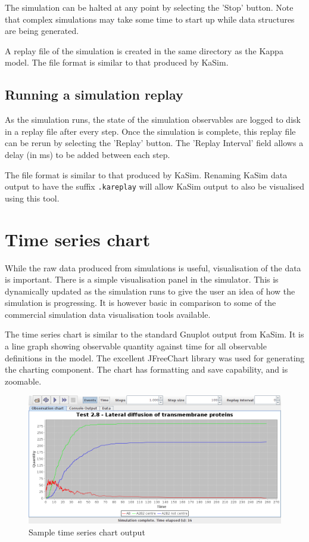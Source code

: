 The simulation can be halted at any point by selecting the 'Stop' button. Note that complex simulations may take some time to start up while data structures are being generated.

A replay file of the simulation is created in the same directory as the Kappa model. The file format is similar to that produced by KaSim.

\subsection{Running a simulation replay}

As the simulation runs, the state of the simulation observables are logged to disk in a replay file after every step. Once the simulation is complete, this replay file can be rerun by selecting the 'Replay' button. The 'Replay Interval' field allows a delay (in ms) to be added between each step.

The file format is similar to that produced by KaSim. Renaming KaSim data output to have the suffix \verb|.kareplay| will allow KaSim output to also be visualised using this tool.

\section{Time series chart}

While the raw data produced from simulations is useful, visualisation of the data is important. There is a simple visualisation panel in the simulator. This is dynamically updated as the simulation runs to give the user an idea of how the simulation is progressing. It is however basic in comparison to some of the commercial simulation data visualisation tools available.

The time series chart is similar to the standard Gnuplot output from KaSim. It is a line graph showing observable quantity against time for all observable definitions in the model. The excellent JFreeChart \citep{JFreeChartwebsite} library was used for generating the charting component. The chart has formatting and save capability, and is zoomable.

\begin{figure}[h!]
 \centering
 \includegraphics[scale=0.3]{./images/ChartPane.png}
 \caption{Sample time series chart output}
 \label{fig:chartPane}
\end{figure}
